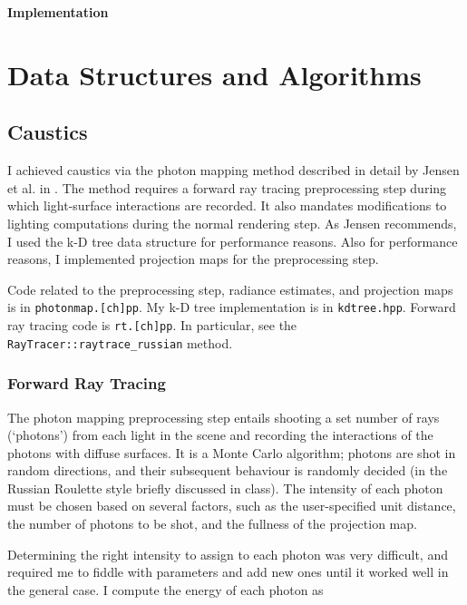 \documentclass{article}
\begin{document}
\begin{center}{\bf \LARGE Implementation}\end{center}

\tableofcontents

\section{Data Structures and Algorithms}

\subsection{Caustics}

I achieved caustics via the photon mapping method described in detail by Jensen
et al. in
\cite{coursenotes}. The method requires a forward ray tracing preprocessing
step during which light-surface interactions are recorded. It also mandates
modifications to lighting computations during the normal rendering step. As
Jensen recommends, I used the k-D tree data structure for performance reasons.
Also for performance reasons, I implemented projection maps for the
preprocessing step.

Code related to the preprocessing step, radiance estimates, and projection maps
is in {\tt photonmap.[ch]pp}. My k-D tree implementation is in {\tt kdtree.hpp}.
Forward ray tracing code is {\tt rt.[ch]pp}. In particular, see the {\tt
RayTracer::raytrace\_russian} method.

\subsubsection{Forward Ray Tracing}

The photon mapping preprocessing step entails shooting a set number of rays
(`photons') from each light in the scene and recording the interactions of the
photons with diffuse surfaces. It is a Monte Carlo algorithm; photons are shot
in random directions, and their subsequent behaviour is randomly decided (in the
Russian Roulette style briefly discussed in class). The intensity of each photon
must be chosen based on several factors, such as the user-specified unit
distance, the number of photons to be shot, and the fullness of the projection
map.

\label{intensity}

Determining the right intensity to assign to each photon was very difficult, and required me to fiddle with parameters and add new ones until it worked well in the general case. I compute the energy of each photon as
\end{document}
